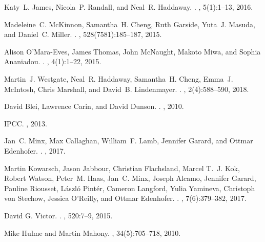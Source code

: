 \documentclass{article}
\begin{document}
\begin{thebibliography}{10}
		Katy~L. James, Nicola~P. Randall, and Neal~R. Haddaway.
		.
		, 5(1):1--13, 2016.
		
		Madeleine~C. McKinnon, Samantha~H. Cheng, Ruth Garside, Yuta~J. Masuda, and
		Daniel~C. Miller.
		.
		, 528(7581):185--187, 2015.
		
		Alison O'Mara-Eves, James Thomas, John McNaught, Makoto Miwa, and Sophia
		Ananiadou.
		.
		, 4(1):1--22, 2015.
		
		Martin~J. Westgate, Neal~R. Haddaway, Samantha~H. Cheng, Emma~J. McIntosh,
		Chris Marshall, and David~B. Lindenmayer.
		.
		, 2(4):588--590, 2018.
		
		David Blei, Lawrence Carin, and David Dunson.
		.
		, 2010.
		
		IPCC.
		, 2013.
		
		Jan~C. Minx, Max Callaghan, William~F. Lamb, Jennifer Garard, and Ottmar
		Edenhofer.
		.
		, 2017.
		
		Martin Kowarsch, Jason Jabbour, Christian Flachsland, Marcel T.~J. Kok, Robert
		Watson, Peter~M. Haas, Jan~C. Minx, Joseph Alcamo, Jennifer Garard, Pauline
		Riousset, L{\'{a}}szl{\'{o}} Pint{\'{e}}r, Cameron Langford, Yulia Yamineva,
		Christoph von Stechow, Jessica O'Reilly, and Ottmar Edenhofer.
		.
		, 7(6):379--382, 2017.
		
		{David G. Victor}.
		.
		, 520:7--9, 2015.
		
		Mike Hulme and Martin Mahony.
		, 34(5):705--718, 2010.
		

\end{thebibliography}
\end{document}
